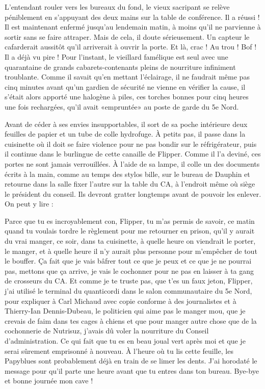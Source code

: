 L’entendant rouler vers les bureaux du fond, le vieux sacripant se relève péniblement en s’appuyant des deux mains sur la table de conférence. Il a réussi ! Il est maintenant enfermé jusqu’au lendemain matin, à moins qu’il ne parvienne à sortir sans se faire attraper. Mais de cela, il doute sérieusement. Un capteur le cafarderait aussitôt qu’il arriverait à ouvrir la porte. Et là, crac ! Au trou ! Bof ! Il a déjà vu pire ! Pour l’instant, le vieillard famélique est seul avec une quarantaine de grands cabarets-contenants pleins de nourriture infiniment troublante. Comme il savait qu’en mettant l’éclairage, il ne faudrait même pas cinq minutes avant qu’un gardien de sécurité ne vienne en vérifier la cause, il s’était alors apporté une halogène à piles, ces torches bonnes pour cinq heures une fois rechargées, qu’il avait «empruntée» au poste de garde du 5e Nord.

Avant de céder à ses envies insupportables, il sort de sa poche intérieure deux feuilles de papier et un tube de colle hydrofuge. À petits pas, il passe dans la cuisinette où il doit se faire violence pour ne pas bondir sur le réfrigérateur, puis il continue dans le burlingue de cette canaille de Flipper. Comme il l’a deviné, ces portes ne sont jamais verrouillées. À l’aide de sa lampe, il colle un des documents écrits à la main, comme au temps des stylos bille, sur le bureau de Dauphin et retourne dans la salle fixer l’autre sur la table du CA, à l’endroit même où siège le président du conseil. Ils devront gratter longtemps avant de pouvoir les enlever. On peut y lire :

    Parce que tu es incroyablement con, Flipper, tu m’as permis de savoir, ce matin quand tu voulais tordre le règlement pour me retourner en prison, qu’il y aurait du vrai manger, ce soir, dans ta cuisinette, à quelle heure on viendrait le porter, le manger, et à quelle heure il n’y aurait plus personne pour m’empêcher de tout le bouffer. Ça fait que je vais bâfrer tout ce que je peux et ce que je ne pourrai pas, mettons que ça arrive, je vais le cochonner pour ne pas en laisser à ta gang de crosseurs du CA. Et comme je te truste pas, que t’es un faux jeton, Flipper, j’ai utilisé le terminal du quanticordi dans le salon communautaire du 5e Nord, pour expliquer à Carl Michaud avec copie conforme à des journalistes et à Thierry-Ian Dennis-Dubeau, le politicien qui aime pas le manger mou, que je crevais de faim dans tes cages à chiens et que pour manger autre chose que de la cochonnerie de Nutrisuz, j’avais dû voler la nourriture du Conseil d’administration. Ce qui fait que tu es en beau joual vert après moi et que je serai sûrement emprisonné à nouveau. À l’heure où tu lis cette feuille, les Papyblues sont probablement déjà en train de se limer les dents. J’ai horodaté le message pour qu’il parte une heure avant que tu entres dans ton bureau. Bye-bye et bonne journée mon cave !

